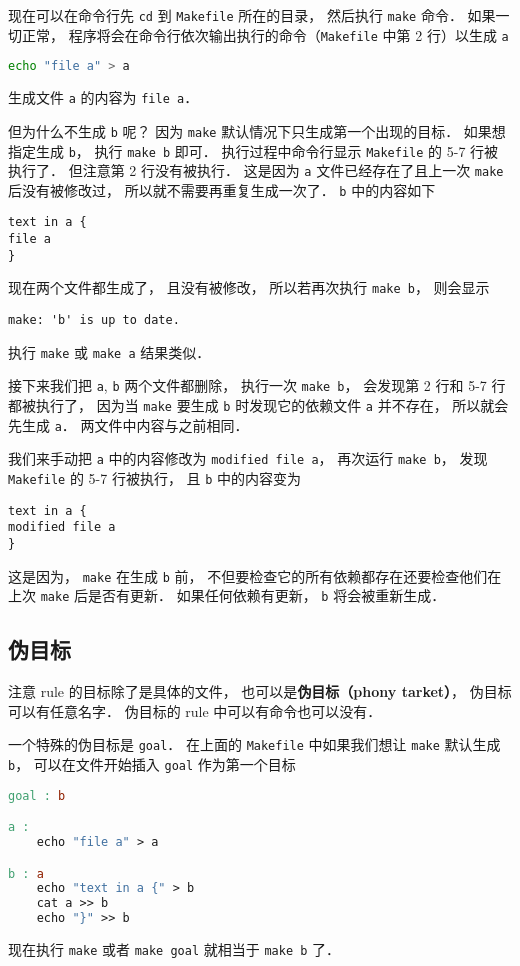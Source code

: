 现在可以在命令行先 \verb|cd| 到 \verb|Makefile| 所在的目录， 然后执行 \verb|make| 命令． 如果一切正常， 程序将会在命令行依次输出执行的命令（\verb|Makefile| 中第 2 行）以生成 \verb|a|
\begin{lstlisting}[language=bash]
echo "file a" > a
\end{lstlisting}
生成文件 \verb|a| 的内容为 \verb|file a|．

但为什么不生成 \verb|b| 呢？ 因为 \verb|make| 默认情况下只生成第一个出现的目标． 如果想指定生成 \verb|b|， 执行 \verb|make b| 即可． 执行过程中命令行显示 \verb|Makefile| 的 5-7 行被执行了． 但注意第 2 行没有被执行． 这是因为 \verb|a| 文件已经存在了且上一次 \verb|make| 后没有被修改过， 所以就不需要再重复生成一次了． \verb|b| 中的内容如下
\begin{lstlisting}
text in a {
file a
}
\end{lstlisting}

现在两个文件都生成了， 且没有被修改， 所以若再次执行 \verb|make b|， 则会显示
\begin{lstlisting}
make: 'b' is up to date.
\end{lstlisting}
执行 \verb|make| 或 \verb|make a| 结果类似．

接下来我们把 \verb|a|, \verb|b| 两个文件都删除， 执行一次 \verb|make b|， 会发现第 2 行和 5-7 行都被执行了， 因为当 \verb|make| 要生成 \verb|b| 时发现它的依赖文件 \verb|a| 并不存在， 所以就会先生成 \verb|a|． 两文件中内容与之前相同．

我们来手动把 \verb|a| 中的内容修改为 \verb|modified file a|， 再次运行 \verb|make b|， 发现 \verb|Makefile| 的 5-7 行被执行， 且 \verb|b| 中的内容变为
\begin{lstlisting}
text in a {
modified file a
}
\end{lstlisting}
这是因为， \verb|make| 在生成 \verb|b| 前， 不但要检查它的所有依赖都存在还要检查他们在上次 \verb|make| 后是否有更新． 如果任何依赖有更新， \verb|b| 将会被重新生成．

\subsection{伪目标}
注意 rule 的目标除了是具体的文件， 也可以是\textbf{伪目标（phony tarket）}， 伪目标可以有任意名字． 伪目标的 rule 中可以有命令也可以没有．

一个特殊的伪目标是 \verb|goal|． 在上面的 \verb|Makefile| 中如果我们想让 \verb|make| 默认生成 \verb|b|， 可以在文件开始插入 \verb|goal| 作为第一个目标
\begin{lstlisting}[language=makefile]
goal : b

a :
	echo "file a" > a

b : a
	echo "text in a {" > b
	cat a >> b
	echo "}" >> b
\end{lstlisting}
现在执行 \verb|make| 或者 \verb|make goal| 就相当于 \verb|make b| 了．

